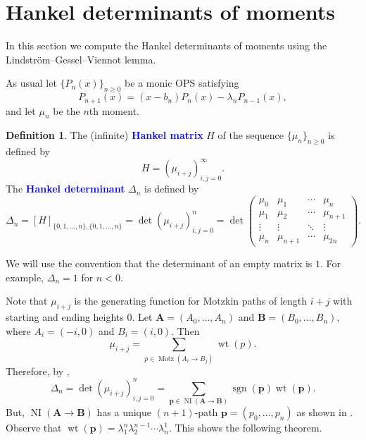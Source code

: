 \documentclass[oneside]{book}
\numberwithin{equation}{section}
\theoremstyle{definition}
\newtheorem{defn}[thm]{Definition}
\newcommand\NI{\operatorname{NI}}
\newcommand\Motz{\operatorname{Motz}}
\newcommand\sgn{\operatorname{sgn}}
\newcommand\wt{\operatorname{wt}}
\renewcommand\vec[1]{\mathbf{#1}}
\renewcommand\emph[1]{\textcolor{blue}{\bf #1}}
\begin{document}
\section{Hankel determinants of moments}

In this section we compute the Hankel determinants of moments using
the Lindstr\"om--Gessel--Viennot lemma.

As usual let \( \{ P_n(x) \}_{n\ge 0} \) be a monic OPS
satisfying
\[
  P_{n+1}(x) = (x-b_n) P_n(x) - \lambda_n P_{n-1}(x),
\]
and let \( \mu_n \) be the \( n \)th moment.


\begin{defn}\label{def:7}
  The (infinite) \emph{Hankel matrix} \( H \) of the sequence
  \( \{ \mu_n\}_{n\ge 0} \) is defined by
  \[
    H = \left( \mu_{i+j} \right)_{i,j=0}^\infty.
  \]
  The \emph{Hankel determinant} \( \Delta_n \) is defined by
\[
  \Delta_n = [H]_{\{0,1,\dots,n\},\{0,1,\dots,n\}} = \det \left(
    \mu_{i+j} \right)_{i,j=0}^n = \det
 \begin{pmatrix}
   \mu_0 & \mu_1 & \cdots & \mu_n\\
   \mu_1 & \mu_2 & \cdots & \mu_{n+1}\\
   \vdots & \vdots & \ddots & \vdots\\
   \mu_n & \mu_{n+1} & \cdots & \mu_{2n}
 \end{pmatrix}.
\]
\end{defn}

We will use the convention that the determinant of an empty matrix is
\( 1 \). For example, \( \Delta_{n} = 1 \) for \( n<0 \).

Note that \( \mu_{i+j} \) is the generating function for Motzkin paths
of length \( i+j \) with starting and ending heights \( 0 \). Let
\( \vec A = (A_0,\dots,A_n) \) and \( \vec B = (B_0,\dots,B_n) \),
where \( A_i = (-i,0) \) and \( B_i = (i,0) \). Then
\[
  \mu_{i+j} = \sum_{p\in \Motz(A_i\to B_j)} \wt(p).
\]
Therefore, by ,
\[
  \Delta_n = \det \left( \mu_{i+j} \right)_{i,j=0}^n = \sum_{\vec p
    \in \NI(\vec A \to \vec B)} \sgn(\vec p) \wt(\vec p).
\]
But, \( \NI(\vec A \to \vec B) \) has a unique \( (n+1) \)-path
\( \vec p = (p_0,\dots,p_n) \) as shown in .
Observe that \( \wt(\vec p) = \lambda_1^n \lambda_2^{n-1} \cdots \lambda_n^1 \).
This shows the following theorem.
\end{document}
